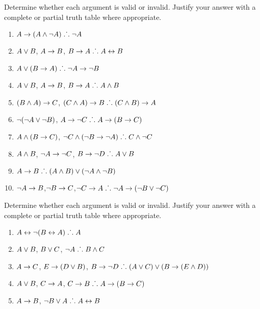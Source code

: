 \noindent\problempart Determine whether each argument is valid or invalid. Justify your answer with a complete or partial truth table where appropriate.
\label{pr.TT.valid} 
\begin{enumerate}
\item $A\rightarrow(A\wedge\neg A)\mathrel{\ldotp\dot{}\,\ldotp} \neg A$%
\item $A \vee B$, $A \rightarrow B$, $B \rightarrow A \mathrel{\ldotp\dot{}\,\ldotp}  A \leftrightarrow B$  %
\item $A\vee(B\rightarrow A)\mathrel{\ldotp\dot{}\,\ldotp} \neg A \rightarrow \neg B$ %
\item $A \vee B$, $A \rightarrow B$, $ B \rightarrow A \mathrel{\ldotp\dot{}\,\ldotp}  A \wedge B$ %
\item $(B\wedge A)\rightarrow C$, $(C\wedge A)\rightarrow B\mathrel{\ldotp\dot{}\,\ldotp} (C\wedge B)\rightarrow A$ %
\item $\neg (\neg A \vee \neg B)$, $A \rightarrow \neg C \mathrel{\ldotp\dot{}\,\ldotp}  A \rightarrow (B \rightarrow C)$ %
\item $A \wedge (B \rightarrow C)$, $\neg C \wedge (\neg B \rightarrow \neg A)\mathrel{\ldotp\dot{}\,\ldotp} C \wedge \neg C$ %
\item $A \wedge B$, $\neg A \rightarrow \neg C$, $B \rightarrow \neg D \mathrel{\ldotp\dot{}\,\ldotp}  A \vee B$ %
\item $A \rightarrow B\mathrel{\ldotp\dot{}\,\ldotp} (A \wedge B) \vee (\neg A \wedge \neg B)$ %
\item $\neg A \rightarrow B$,$ \neg B \rightarrow C $,$ \neg C \rightarrow A \mathrel{\ldotp\dot{}\,\ldotp}  \neg A \rightarrow (\neg B \vee \neg C) $%

\end{enumerate}

\noindent\problempart Determine whether each argument is valid or invalid. Justify your answer with a complete or partial truth table where appropriate.
\label{pr.TT.valid} 
\begin{enumerate}
\item $A\leftrightarrow\neg(B\leftrightarrow A)\mathrel{\ldotp\dot{}\,\ldotp} A$ %
\item $A\vee B$, $B\vee C$, $\neg A\mathrel{\ldotp\dot{}\,\ldotp} B \wedge C$ %
\item $A \rightarrow C$, $E \rightarrow (D \vee B)$, $B \rightarrow \neg D\mathrel{\ldotp\dot{}\,\ldotp} (A \vee C) \vee (B \rightarrow (E \wedge D))$ %
\item $A \vee B$, $C \rightarrow A$, $C \rightarrow B\mathrel{\ldotp\dot{}\,\ldotp} A \rightarrow (B \rightarrow C)$ %
\item $A \rightarrow B$, $\neg B \vee A\mathrel{\ldotp\dot{}\,\ldotp} A \leftrightarrow B$ %
\end{enumerate}

